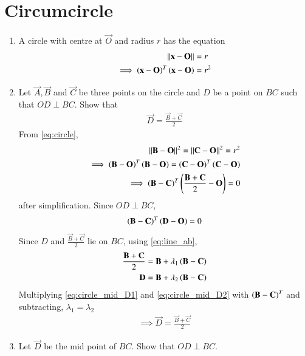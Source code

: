 \documentclass[journal,12pt,twocolumn]{IEEEtran}
\renewcommand\thesection{\arabic{section}}
\begin{document}
\section{Circumcircle}
\begin{enumerate}[label=\thesection.\arabic*
,ref=\thesection.\theenumi]
\item A circle with centre at  $\vec{O}$ and radius $r$ has the equation 
\begin{align}
\lVert\mathbf{x}-\mathbf{O}\rVert&=r
\\
\implies \left(\mathbf{x}-\mathbf{O}\right)^T\left(\mathbf{x}-\mathbf{O}\right) &= r^2
\label{eq:circle}
\end{align}
\item Let $\vec{A},\vec{B}$ and $\vec{C}$ be three points on the circle and 
$D$ be a point on $BC$ such that
$OD \perp BC$.  Show that 
\begin{align}
\vec{D}=\frac{\vec{B}+\vec{C}}{2}
\end{align}
%
\solution From \eqref{eq:circle},
\begin{align}
\lVert\mathbf{B}-\mathbf{O}\rVert^2=\lVert\mathbf{C}-\mathbf{O}\rVert^2=r^2
\\
 \implies \left(\mathbf{B}-\mathbf{O}\right)^T\left(\mathbf{B}-\mathbf{O}\right) = 
\left(\mathbf{C}-\mathbf{O}\right)^T\left(\mathbf{C}-\mathbf{O}\right) 
\\
 \implies \left(\mathbf{B}-\mathbf{C}\right)^T\left(\frac{\mathbf{B}+\mathbf{C}}{2} - 
\mathbf{O}\right)  = 0
\label{eq:circle_mid}
\end{align}
after simplification. Since $OD \perp BC$,
\begin{align}
\left(\mathbf{B}-\mathbf{C}\right)^T\left(\mathbf{D}-\mathbf{O}\right) = 0 
\label{eq:circle_D}
\end{align}
Since $D$ and $\frac{\vec{B}+\vec{C}}{2}$ lie on $BC$, using 
\eqref{eq:line_ab},
\begin{align}
\label{eq:circle_mid_D1}
\frac{\mathbf{B}+\mathbf{C}}{2}
&= \mathbf{B}+ \lambda_1\left(\mathbf{B}-\mathbf{C}\right)
\\
\mathbf{D}
&= \mathbf{B}+ \lambda_2\left(\mathbf{B}-\mathbf{C}\right)
\label{eq:circle_mid_D2}
\end{align}
Multiplying \eqref{eq:circle_mid_D1} and \eqref{eq:circle_mid_D2} with 
$\left(\mathbf{B}-\mathbf{C}\right)^T$ and subtracting, $\lambda_1=\lambda_2$
%
\begin{align}
\implies \vec{D} = \frac{\vec{B}+\vec{C}}{2}
\label{eq:circle_bisect}
\end{align}
%
\item Let  $\vec{D}$ be the mid point of $BC$.  Show that $OD \perp BC$.
%
\end{enumerate}
\end{document}
